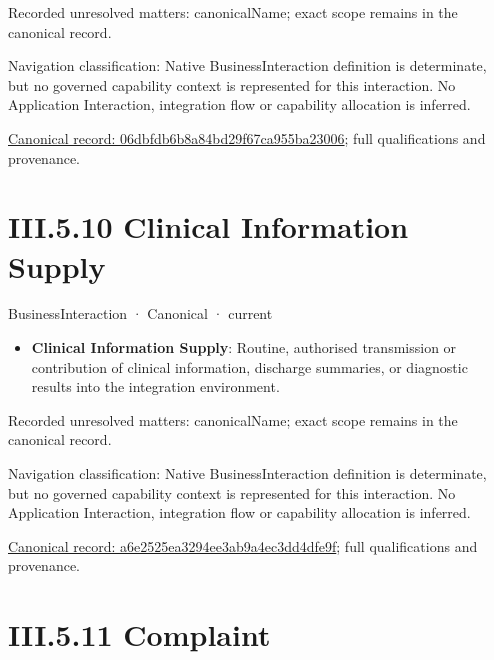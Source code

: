 {\small Recorded unresolved matters: canonicalName; exact scope remains in the canonical record.}\par
{\small Navigation classification: Native BusinessInteraction definition is determinate, but no governed capability context is represented for this interaction. No Application Interaction, integration flow or capability allocation is inferred.}\par
{\footnotesize \href{../../../../../../../continuum/business/business-interaction/06dbfdb6b8a84bd29f67ca955ba23006.md}{Canonical record: 06dbfdb6b8a84bd29f67ca955ba23006}; full qualifications and provenance.}\par
\section*{III.5.10 Clinical Information Supply}
\label{navigation:III.5.10}

\label{element:a6e2525ea3294ee3ab9a4ec3dd4dfe9f}
{\small BusinessInteraction · Canonical · current}\par

\begin{itemize}


\item \textbf{Clinical Information Supply}: Routine, authorised transmission or contribution of clinical information, discharge summaries, or diagnostic results into the integration environment.

\end{itemize}

{\small Recorded unresolved matters: canonicalName; exact scope remains in the canonical record.}\par
{\small Navigation classification: Native BusinessInteraction definition is determinate, but no governed capability context is represented for this interaction. No Application Interaction, integration flow or capability allocation is inferred.}\par
{\footnotesize \href{../../../../../../../continuum/business/business-interaction/a6e2525ea3294ee3ab9a4ec3dd4dfe9f.md}{Canonical record: a6e2525ea3294ee3ab9a4ec3dd4dfe9f}; full qualifications and provenance.}\par
\section*{III.5.11 Complaint}
\label{navigation:III.5.11}

